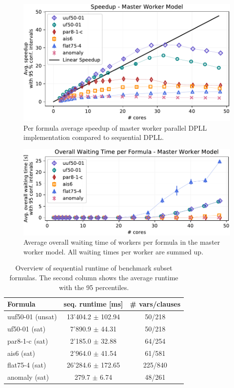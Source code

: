 \documentclass[letterpaper]{article}
\begin{document}
\begin{figure}[h!]
    \centering
    \includegraphics[width=\columnwidth]{figures/scaling_parallel_subset_dpll_scaling_tar.pdf}
    \caption{Per formula average speedup of master worker parallel DPLL implementation compared to sequential DPLL.}
    \label{fig:dpll_parallel_speedup}
\end{figure}
\begin{figure}[h!]
    \centering
    \includegraphics[width=\columnwidth]{figures/waiting_parallel_subset_dpll_scaling_tar.pdf}
    \caption{Average overall waiting time of workers per formula in the master worker model.
    All waiting times per worker are summed up.}
    \label{fig:dpll_parallel_waiting}
\end{figure}
\begin{table}[h!]
    \centering
    \begin{tabularx}{\columnwidth}{|X|c|c|}
        \hline
        Formula & seq. runtime [ms] & \# vars/clauses\\
        \hline
        \hline
        uuf50-01 (unsat) & 13'404.2 $\pm$ 102.94 & 50/218\\
        \hline
        uf50-01 (sat) & 7'890.9 $\pm$ 44.31 & 50/218\\
        \hline
        par8-1-c (sat) & 2'185.0 $\pm$ 32.88 & 64/254\\
        \hline
        ais6 (sat) &  2'964.0 $\pm$ 41.54 & 61/581\\
        \hline
        flat75-4 (sat) & 26'284.6 $\pm$ 172.65 & 225/840\\
        \hline
        anomaly (sat) & 279.7 $\pm$ 6.74 & 48/261\\
        \hline
    \end{tabularx}
    \caption{Overview of sequential runtime of benchmark subset formulas.
    The second column shows the average runtime with the 95 percentiles.}
    \label{tab:cnfs_representatives}
\end{table}
\end{document}
